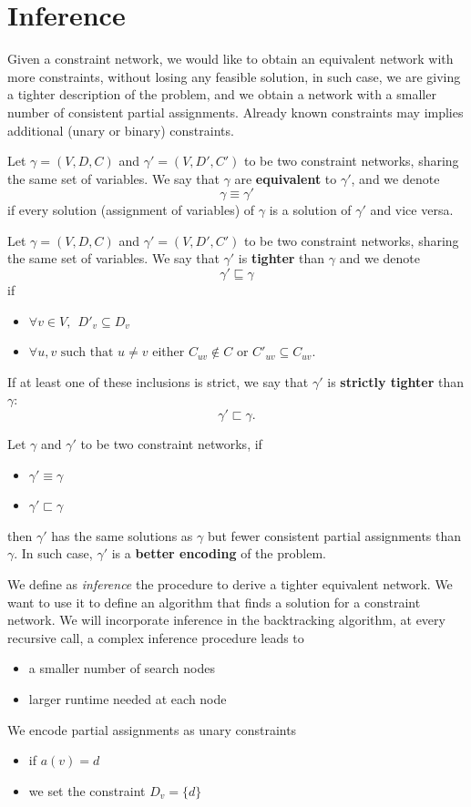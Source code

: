 \documentclass[10pt, letterpaper]{report}
\begin{document}
\section{Inference}
Given a constraint network, we would like to obtain an equivalent network with more constraints, without losing any feasible solution, in such case, we are giving a tighter description of the problem, and we obtain a network with a smaller number of
consistent partial assignments. Already known constraints may implies additional (unary or binary) constraints.\begin{definition}
    Let $\gamma=(V,D,C)$ and $\gamma'=(V,D',C')$ to be two constraint networks, sharing the same set of variables. We say that $\gamma$ are \textbf{equivalent} to $\gamma'$, and we denote $$ \gamma\equiv\gamma' $$
    if every solution (assignment of variables) of $\gamma$ is a solution of $\gamma'$ and vice versa.
\end{definition}
\begin{definition}
    Let $\gamma=(V,D,C)$ and $\gamma'=(V,D',C')$ to be two constraint networks, sharing the same set of variables. We say that $\gamma'$ is \textbf{tighter} than $\gamma$ and we denote $$ \gamma'\sqsubseteq \gamma $$
    if
\begin{itemize}
    \item $\forall v\in V, \ \ D'_v\subseteq D_v$
    \item $\forall u,v \text{ such that }u\ne v$ either $C_{uv}\notin C$ or $C'_{uv}\subseteq C_{uv}$.
\end{itemize}\end{definition}
If at least one of these inclusions is strict, we say that  $\gamma'$ is \textbf{strictly tighter} than $\gamma$: $$ \gamma'\sqsubset \gamma. $$\begin{theorem}
    Let $\gamma$ and $\gamma'$ to be two constraint networks, if\begin{itemize}
        \item $\gamma'\equiv\gamma$
        \item $\gamma'\sqsubset\gamma$
    \end{itemize}
    then $\gamma'$ has the same solutions as $\gamma$ but fewer consistent partial
assignments than $\gamma$. In such case, $\gamma'$ is a \textbf{better encoding} of the problem.
\end{theorem}
We define as \textit{inference} the procedure to derive a tighter equivalent network. We want to use it to define an algorithm that finds a solution for a constraint network. We will incorporate inference in the  backtracking algorithm, at every recursive call, a complex inference procedure leads to\begin{itemize}
    \item a smaller  number of search nodes 
    \item larger runtime needed at each node
\end{itemize} 
We encode partial assignments as unary constraints\begin{itemize}
    \item if $a(v)=d$
    \item we set the constraint $D_v=\{d\}$
\end{itemize}
\end{document}
